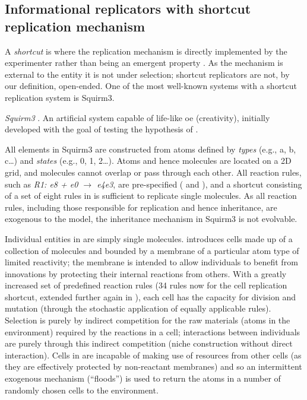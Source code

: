 \subsection{Informational replicators with shortcut replication mechanism}

A \emph{shortcut} is where the replication mechanism is directly implemented by the experimenter rather than being an emergent property \parencite{BanzhafBaumgaertnerBeslonEtAl2016}. As the mechanism is external to the entity it is not under selection; shortcut replicators are not, by our definition, open-ended. One of the most well-known systems with a shortcut replication system is Squirm3.

\emph{Squirm3} \parencite{Hutton2007,Hutton2002}. An artificial system capable of life-like \gls{oe} (creativity), initially developed with the goal of testing the hypothesis of \textcite{Taylor2001} \parencite[p.341]{Hutton2002}.

All elements in Squirm3 are constructed from atoms defined by \emph{types} (e.g., a, b, c\dots) and \emph{states} (e.g., 0, 1, 2\dots). Atoms and hence molecules are located on a 2D grid, and molecules cannot overlap or pass through each other. All reaction rules, such as \emph{R1: e8 + e0 $\rightarrow$ e4e3}, are pre-specified (\textcite[p.4]{Hutton2007} and \textcite[p.49]{Faulconbridge2011}), and a shortcut consisting of a set of eight rules in \textcite{Hutton2002} is sufficient to replicate single molecules. As all reaction rules, including those responsible for replication and hence inheritance, are exogenous to the model, the inheritance mechanism in Squirm3 is not evolvable. 

Individual entities in \textcite{Hutton2002} are simply single molecules. \Textcite{Hutton2007} introduces cells made up of a collection of molecules and bounded by a membrane of a particular atom type of limited reactivity; the membrane is intended to allow individuals to benefit from innovations by protecting their internal reactions from others. With a greatly increased set of predefined reaction rules (34 rules now for the cell replication shortcut, extended further again in \textcite{Lucht2012}), each cell has the capacity for division and mutation (through the stochastic application of equally applicable rules).  Selection is purely by indirect competition for the raw materials (atoms in the environment) required by the reactions in a cell; interactions between individuals are purely through this indirect competition (niche construction without direct interaction). Cells in \textcite{Hutton2007} are incapable of making use of resources from other cells (as they are effectively protected by non-reactant membranes) and so an intermittent exogenous mechanism (``floods'') is used to return the atoms in a number of randomly chosen cells to the environment.

